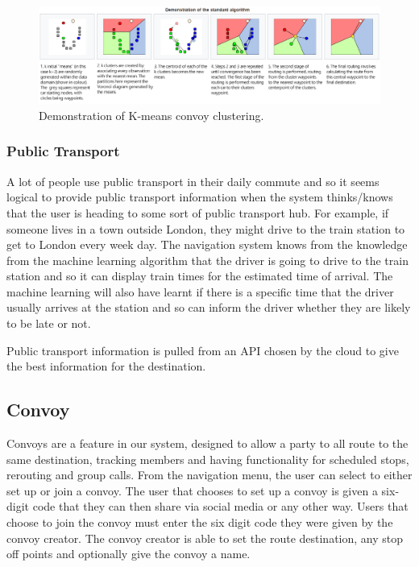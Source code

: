 \documentclass{article}
\begin{document}
\begin{figure}[H]
  \centering
  \includegraphics[scale=0.55]{kmeanscluster}
  \caption{Demonstration of K-means convoy clustering.}\label{nav-kmeans}
\end{figure}

\subsubsection{Public Transport}
A lot of people use public transport in their daily commute and so it seems logical to provide public transport information when the system thinks/knows that the user is heading to some sort of public transport hub. For example, if someone lives in a town outside London, they might drive to the train station to get to London every week day. The navigation system knows from the knowledge from the machine learning algorithm that the driver is going to drive to the train station and so it can display train times for the estimated time of arrival. The machine learning will also have learnt if there is a specific time that the driver usually arrives at the station and so can inform the driver whether they are likely to be late or not.

Public transport information is pulled from an API chosen by the cloud to give the best information for the destination.

\subsection{Convoy}\label{ssec:nav-convoy} %
Convoys are a feature in our system, designed to allow a party to all route to the same destination, tracking members and having functionality for scheduled stops, rerouting and group calls. From the navigation menu, the user can select to either set up or join a convoy. The user that chooses to set up a convoy is given a six-digit code that they can then share via social media or any other way. Users that choose to join the convoy must enter the six digit code they were given by the convoy creator. The convoy creator is able to set the route destination, any stop off points and optionally give the convoy a name.
\end{document}
